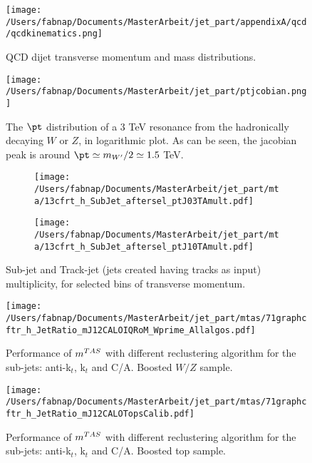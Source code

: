 \begin{figure}
    \centering
   \texttt{[image: /Users/fabnap/Documents/MasterArbeit/jet\_part/appendixA/qcd/qcdkinematics.png]}
   
    \caption{QCD dijet transverse momentum and mass distributions.}
    \label{fig:qcdkinematics}
\end{figure}

\begin{figure}[!ht]
  \centering
      \texttt{[image: /Users/fabnap/Documents/MasterArbeit/jet\_part/ptjcobian.png]}
  \caption{The $\pt$ distribution of a 3 TeV resonance from the hadronically decaying $W$ or $Z$, in logarithmic plot. As can be seen, the jacobian peak is around $\pt\simeq m_{W'}/2\simeq 1.5$ TeV.}
  \label{fig:ptjacobian}
\end{figure}


\begin{figure}
    \centering
    \begin{subfigure}[b]{0.45\textwidth}
	\centering
        \texttt{[image: /Users/fabnap/Documents/MasterArbeit/jet\_part/mta/13cfrt\_h\_SubJet\_aftersel\_ptJ03TAmult.pdf]}
 
    \end{subfigure}
    \begin{subfigure}[b]{0.45\textwidth}
	\centering
        \texttt{[image: /Users/fabnap/Documents/MasterArbeit/jet\_part/mta/13cfrt\_h\_SubJet\_aftersel\_ptJ10TAmult.pdf]}
   
    \end{subfigure}
    \caption{Sub-jet and Track-jet (jets created having tracks as input) multiplicity, for selected bins of transverse momentum.} 
    \label{fig:multi}
\end{figure}


\begin{figure}
    \centering
   \texttt{[image: /Users/fabnap/Documents/MasterArbeit/jet\_part/mtas/71graphcftr\_h\_JetRatio\_mJ12CALOIQRoM\_Wprime\_Allalgos.pdf]}
   
    \caption{Performance of $m^{TAS}$ with different reclustering algorithm for the sub-jets: anti-k$_t$, k$_t$ and C/A. Boosted $W/Z$ sample.}
    \label{fig:allalgow}
\end{figure}

\begin{figure}
    \centering
   \texttt{[image: /Users/fabnap/Documents/MasterArbeit/jet\_part/mtas/71graphcftr\_h\_JetRatio\_mJ12CALOTopsCalib.pdf]}
   
    \caption{Performance of $m^{TAS}$ with different reclustering algorithm for the sub-jets: anti-k$_t$, k$_t$ and C/A. Boosted top sample.}
    \label{fig:allalgotop}
\end{figure}

